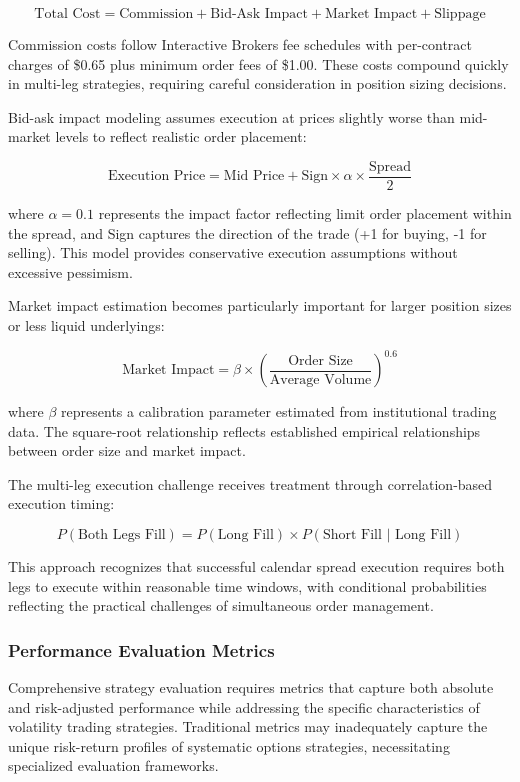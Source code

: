 \documentclass[
  american,
  11pt,
  11pt,
  letterpaper,
  onecolumn]{article}
\begin{document}
\[\text{Total Cost} = \text{Commission} + \text{Bid-Ask Impact} + \text{Market Impact} + \text{Slippage}\]

Commission costs follow Interactive Brokers fee schedules with
per-contract charges of \$0.65 plus minimum order fees of \$1.00. These
costs compound quickly in multi-leg strategies, requiring careful
consideration in position sizing decisions.

Bid-ask impact modeling assumes execution at prices slightly worse than
mid-market levels to reflect realistic order placement:

\[\text{Execution Price} = \text{Mid Price} + \text{Sign} \times \alpha \times \frac{\text{Spread}}{2}\]

where \(\alpha = 0.1\) represents the impact factor reflecting limit
order placement within the spread, and Sign captures the direction of
the trade (+1 for buying, -1 for selling). This model provides
conservative execution assumptions without excessive pessimism.

Market impact estimation becomes particularly important for larger
position sizes or less liquid underlyings:

\[\text{Market Impact} = \beta \times \left(\frac{\text{Order Size}}{\text{Average Volume}}\right)^{0.6}\]

where \(\beta\) represents a calibration parameter estimated from
institutional trading data. The square-root relationship reflects
established empirical relationships between order size and market
impact.

The multi-leg execution challenge receives treatment through
correlation-based execution timing:

\[P(\text{Both Legs Fill}) = P(\text{Long Fill}) \times P(\text{Short Fill | Long Fill})\]

This approach recognizes that successful calendar spread execution
requires both legs to execute within reasonable time windows, with
conditional probabilities reflecting the practical challenges of
simultaneous order management.

\subsubsection{Performance Evaluation
Metrics}\label{performance-evaluation-metrics}

Comprehensive strategy evaluation requires metrics that capture both
absolute and risk-adjusted performance while addressing the specific
characteristics of volatility trading strategies. Traditional metrics
may inadequately capture the unique risk-return profiles of systematic
options strategies, necessitating specialized evaluation frameworks.
\end{document}
